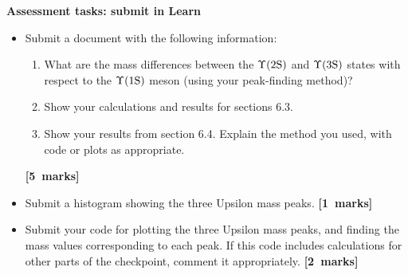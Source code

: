 \begin{enumerate}




\end{enumerate}

{\bf Assessment tasks: submit in Learn}

\begin{itemize}

\item Submit a document with the following information:
\begin{enumerate}
\item What are the mass differences between the $\Upsilon \rm (2S)$ and $\Upsilon \rm (3S)$ states with respect to the $\Upsilon \rm (1S)$ meson (using your peak-finding method)?
\item Show your calculations and results for sections 6.3.
\item Show your results from section 6.4. Explain the method you used, with code or plots as appropriate.
\end{enumerate}
\hfill {\bf[5~marks]}

\item Submit a histogram showing the three Upsilon mass peaks.
\null\hfill {\bf[1~marks]}

\item Submit your code for plotting the three Upsilon mass peaks, and finding the mass values corresponding to each peak.
If this code includes calculations for other parts of the checkpoint, comment it appropriately.
\null\hfill {\bf[2~marks]}

\end{itemize}


